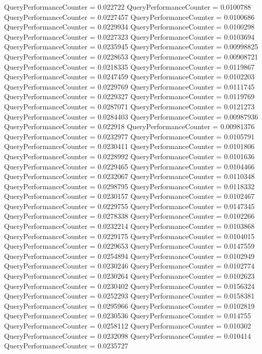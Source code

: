\documentclass[9pt]{article}
\theoremstyle{plain}
\theoremstyle{definition}
\theoremstyle{remark}
\numberwithin{equation}{section}
\begin{document}
QueryPerformanceCounter  =  0.022722
QueryPerformanceCounter  =  0.0100788
QueryPerformanceCounter  =  0.0227457
QueryPerformanceCounter  =  0.0100686
QueryPerformanceCounter  =  0.0229934
QueryPerformanceCounter  =  0.0100298
QueryPerformanceCounter  =  0.0227323
QueryPerformanceCounter  =  0.0103694
QueryPerformanceCounter  =  0.0235945
QueryPerformanceCounter  =  0.00998825
QueryPerformanceCounter  =  0.0228653
QueryPerformanceCounter  =  0.00908721
QueryPerformanceCounter  =  0.0218335
QueryPerformanceCounter  =  0.0119867
QueryPerformanceCounter  =  0.0247459
QueryPerformanceCounter  =  0.0102203
QueryPerformanceCounter  =  0.0229769
QueryPerformanceCounter  =  0.0111745
QueryPerformanceCounter  =  0.0229327
QueryPerformanceCounter  =  0.0119769
QueryPerformanceCounter  =  0.0287071
QueryPerformanceCounter  =  0.0121273
QueryPerformanceCounter  =  0.0284403
QueryPerformanceCounter  =  0.00987936
QueryPerformanceCounter  =  0.022918
QueryPerformanceCounter  =  0.00981376
QueryPerformanceCounter  =  0.0232977
QueryPerformanceCounter  =  0.0105791
QueryPerformanceCounter  =  0.0230411
QueryPerformanceCounter  =  0.0101806
QueryPerformanceCounter  =  0.0228992
QueryPerformanceCounter  =  0.0101636
QueryPerformanceCounter  =  0.0229465
QueryPerformanceCounter  =  0.0104466
QueryPerformanceCounter  =  0.0232067
QueryPerformanceCounter  =  0.0110348
QueryPerformanceCounter  =  0.0298795
QueryPerformanceCounter  =  0.0118332
QueryPerformanceCounter  =  0.0230157
QueryPerformanceCounter  =  0.0102467
QueryPerformanceCounter  =  0.0229755
QueryPerformanceCounter  =  0.0147345
QueryPerformanceCounter  =  0.0278338
QueryPerformanceCounter  =  0.0102266
QueryPerformanceCounter  =  0.0232214
QueryPerformanceCounter  =  0.0103868
QueryPerformanceCounter  =  0.0229175
QueryPerformanceCounter  =  0.0104015
QueryPerformanceCounter  =  0.0229653
QueryPerformanceCounter  =  0.0147559
QueryPerformanceCounter  =  0.0254894
QueryPerformanceCounter  =  0.0102949
QueryPerformanceCounter  =  0.0230246
QueryPerformanceCounter  =  0.0102774
QueryPerformanceCounter  =  0.0230264
QueryPerformanceCounter  =  0.0102623
QueryPerformanceCounter  =  0.0230402
QueryPerformanceCounter  =  0.0156324
QueryPerformanceCounter  =  0.0252293
QueryPerformanceCounter  =  0.0158381
QueryPerformanceCounter  =  0.0295966
QueryPerformanceCounter  =  0.0102819
QueryPerformanceCounter  =  0.0230536
QueryPerformanceCounter  =  0.014755
QueryPerformanceCounter  =  0.0258112
QueryPerformanceCounter  =  0.010302
QueryPerformanceCounter  =  0.0232098
QueryPerformanceCounter  =  0.010414
QueryPerformanceCounter  =  0.0235727
\end{document}
